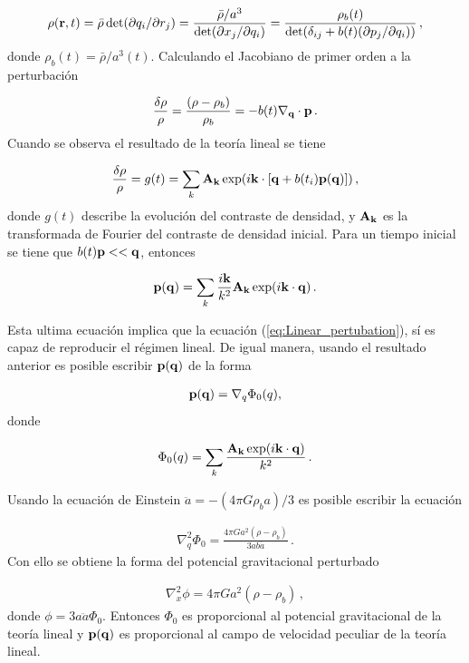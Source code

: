 \begin{align}
\rho({\bf{r}},t) = \bar{\rho}\det(\partial q_{i}/\partial r_{j})=\frac{\bar{\rho}/a^{3}}{\det(\partial x_{j}/\partial q_{i})} = \frac{\rho_{b}(t)}{\det(\delta_{ij} + b(t)(\partial p_{j}/ \partial q_{i}))}\,,
\label{eq:density}
\end{align}
%
donde $\rho_{b}(t)=\bar{\rho}/a^{3}(t)$. Calculando el Jacobiano de primer orden a la perturbación

\begin{align}
\frac{\delta\rho}{\rho}=\frac{(\rho-\rho_{b})}{\rho_{b}} = -b(t)\bf{\nabla_{q}\cdot p }\,.
\label{eq:Underdensity}
\end{align}
%
Cuando se observa el resultado de la teoría lineal se tiene 

\begin{align}
\frac{\delta\rho}{\rho}=g(t)=\sum_{k}{\bf{A_{k}}}\exp(i{\bf{k}}\cdot[{\bf{q}}+b(t_{i}){\bf{p(q)}}])\,,
\end{align}
%
donde $g(t)$ describe la evolución del contraste de densidad, y ${\bf{A_{k}}}$ es la transformada de Fourier del contraste de densidad inicial. Para un tiempo inicial se tiene que $b(t){\bf{p}}<< {\bf{q}}$, entonces

\begin{align}
{\bf{p(q)}}=\sum_{k}\frac{i{\bf{k}}}{k^{2}}{\bf{A_{k}}}\exp(i{\bf{k\cdot q}})\,.
\end{align}

Esta ultima ecuación implica que la ecuación (\ref{eq:Linear_pertubation}), sí es capaz de reproducir el régimen lineal. De igual manera, usando el resultado anterior es posible escribir ${\bf{p(q)}}$ de la forma

\begin{align}
{\bf{p(q)}} = \nabla_{q}\Phi_{0}(q), 
\end{align}
%
donde 

\begin{align}
\Phi_{0}(q) = \sum_{k}\frac{{\bf{A_{k}}}\exp(i{\bf{k\cdot q}})}{k^{2}}\,.
\end{align}

Usando la ecuación de Einstein $\ddot{a}=-(4\pi G\rho_{b}a)/3$ es posible escribir la ecuación

\begin{align}
\nabla_{q}^{2}\Phi_{0}=\frac{4\pi Ga^{2}(\rho-\rho_{b})}{3ab\ddot{a}}\,.
\end{align}
%
Con ello se obtiene la forma del potencial gravitacional perturbado

\begin{align}
\nabla_{x}^{2}\phi=4\pi Ga^{2}(\rho-\rho_{b})\,,
\end{align} 
%
donde $\phi = 3a\ddot{a}\Phi_{0}$.  Entonces $\Phi_{0}$ es proporcional al potencial gravitacional de la teoría lineal y ${\bf{p(q)}}$ es proporcional al campo de velocidad peculiar de la teoría lineal. 

